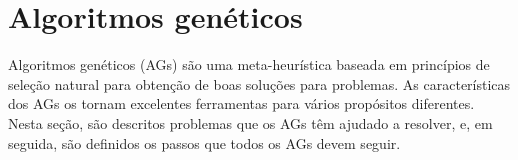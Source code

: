 \section{Algoritmos genéticos}

Algoritmos genéticos (AGs) são uma meta-heurística baseada em princípios de seleção natural para obtenção de boas soluções para problemas. As características dos AGs os tornam excelentes ferramentas para vários propósitos diferentes. Nesta seção, são descritos problemas que os AGs têm ajudado a resolver, e, em seguida, são definidos os passos que todos os AGs devem seguir.

